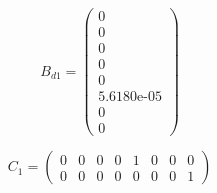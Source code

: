\begin{equation}  \label{eq:Bd}
	B_{d1} = \left(\begin{array}{c}
		0\\
		0\\
		0\\
		0\\
		0\\
		\text{5.6180e-05}\\
		0\\
		0
	\end{array}\right)
\end{equation}


%

\medskip

\begin{equation}  \label{eq:C1}
	C_1 =\left(\begin{array}{cccccccc}
		0 &    0 &    0 &    0 &    1 &    0 &    0 &    0 \\
		0 &    0 &    0 &    0 &    0 &    0 &    0 &    1
	\end{array}\right)
\end{equation}


